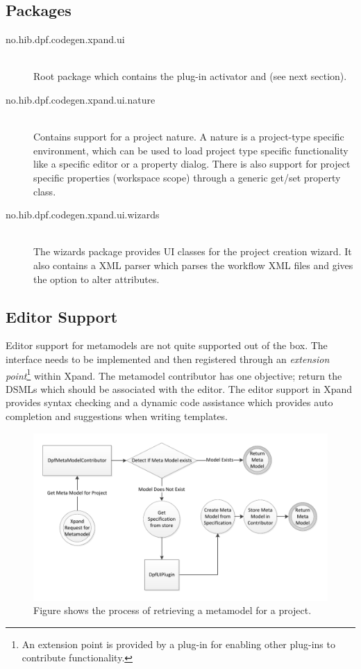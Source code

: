 \subsection{Packages}
\begin{description}
  \item[no.hib.dpf.codegen.xpand.ui] \hfill \\
  Root package which contains the plug-in activator and  (see next section). 
  \item[no.hib.dpf.codegen.xpand.ui.nature] \hfill \\
  Contains support for a project nature. A nature is a project-type specific environment, which can be used to load project type specific functionality like a specific editor or a property dialog. There is also support for project specific properties (workspace scope) through a generic get/set property class.
  \item[no.hib.dpf.codegen.xpand.ui.wizards] \hfill \\
  The wizards package provides UI classes for the project creation wizard. It also contains a XML parser which parses the workflow XML files and gives the option to alter attributes.
\end{description}

\subsection{Editor Support}\label{subsec:editor_support}
Editor support for metamodels are not quite supported out of the box. The  interface needs to be implemented and then registered through an \emph{extension point}\footnote{An extension point is provided by a plug-in for enabling other plug-ins to contribute functionality.} within Xpand. The metamodel contributor has one objective; return the DSMLs which should be associated with the editor. The editor support in Xpand provides syntax checking and a dynamic code assistance which provides auto completion and suggestions when writing templates.

\begin{figure}[ht]
  \centering
  \centerline{\includegraphics[scale=0.7]{images/metamodel_contributor.pdf}}
  \caption[MetamodelContributor flow chart]{Figure shows the process of retrieving a metamodel for a project.}
  \label{fig:metamodel_contributor_flow}
\end{figure}

